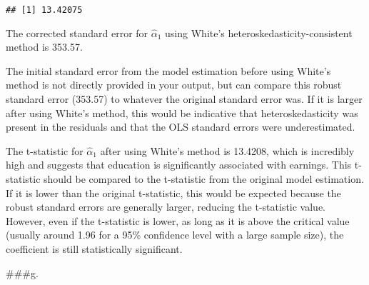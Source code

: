 \documentclass[
]{article}
\begin{document}
\begin{verbatim}
## [1] 13.42075
\end{verbatim}

The corrected standard error for \(\hat{\alpha}_1\) using White's
heteroskedasticity-consistent method is 353.57.

The initial standard error from the model estimation before using
White's method is not directly provided in your output, but can compare
this robust standard error (353.57) to whatever the original standard
error was. If it is larger after using White's method, this would be
indicative that heteroskedasticity was present in the residuals and that
the OLS standard errors were underestimated.

The t-statistic for \(\hat{\alpha}_1\) after using White's method is
13.4208, which is incredibly high and suggests that education is
significantly associated with earnings. This t-statistic should be
compared to the t-statistic from the original model estimation. If it is
lower than the original t-statistic, this would be expected because the
robust standard errors are generally larger, reducing the t-statistic
value. However, even if the t-statistic is lower, as long as it is above
the critical value (usually around 1.96 for a 95\% confidence level with
a large sample size), the coefficient is still statistically
significant.

\#\#\#g.
\end{document}
